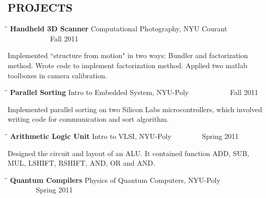 \documentclass{res}
\begin{document}
\begin{resume}
\section{PROJECTS}
   \vspace{-0.05in}	
  \begin{tabbing}
   \hspace{2.3in}\= \hspace{2.6in}\= \kill %
    {\bf Handheld 3D Scanner} \>Computational Photography, NYU Courant\> ~~~~~~~~~~~~Fall 2011\\
   \end{tabbing}\vspace{-20pt}
    Implemented ``structure from motion" in two ways: Bundler and factorization method. Wrote code to implement factorization method. Applied two matlab toolboxes in camera calibration. \\ 
       \begin{tabbing}
   \hspace{2.3in}\= \hspace{2.6in}\= \kill %
    {\bf Parallel Sorting} \>Intro to Embedded System, NYU-Poly     \>~~~~~~~~~~~Fall 2011 \\
     \end{tabbing}\vspace{-20pt}      %
     Implemented parallel sorting on two Silicon Labs microcontrollers, which involved writing code for communication and sort algorithm.
   \begin{tabbing}%
   \hspace{2.3in}\= \hspace{2.6in}\= \kill %
   {\bf Arithmetic Logic Unit}  \>Intro to VLSI, NYU-Poly\> ~~~~~~~~Spring 2011\\
   \end{tabbing}\vspace{-20pt}
    Designed the circuit and layout of an ALU. It contained function ADD, SUB, MUL, LSHIFT, RSHIFT, AND, OR and AND. 
      \begin{tabbing}%
   \hspace{2.3in}\= \hspace{2.6in}\= \kill %
   {\bf Quantum Compilers}  \>Physics of Quantum Computers, NYU-Poly\> ~~~~~~~~Spring 2011\\
   \end{tabbing}\vspace{-20pt}

\end{resume}
\end{document}
